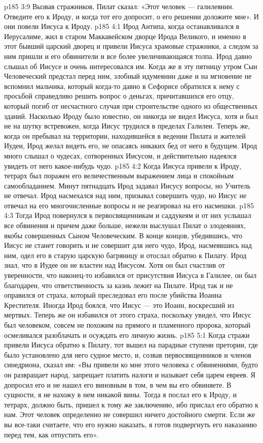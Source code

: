 \vs p185 3:9 Вызвав стражников, Пилат сказал: «Этот человек --- галилеянин. Отведите его к Ироду, и когда тот его допросит, о его решении доложите мне». И они повели Иисуса к Ироду.
\vs p185 4:1 Ирод Антипа, когда останавливался в Иерусалиме, жил в старом Маккавейском дворце Ирода Великого, и именно в этот бывший царский дворец и привели Иисуса храмовые стражники, а следом за ним пришли и его обвинители и все более увеличивающаяся толпа. Ирод давно слышал об Иисусе и очень интересовался им. Когда же в эту пятницу утром Сын Человеческий предстал перед ним, злобный идумеянин даже и на мгновение не вспомнил мальчика, который когда\hyp{}то давно в Сефорисе обратился к нему с просьбой справедливо решить вопрос о деньгах, причитавшихся его отцу, который погиб от несчастного случая при строительстве одного из общественных зданий. Насколько Ироду было известно, он никогда не видел Иисуса, хотя и был не на шутку встревожен, когда Иисус трудился в пределах Галилеи. Теперь же, когда он пребывал на территории, находившейся в ведении Пилата и жителей Иудеи, Ирод желал видеть его, не опасаясь никаких бед от него в будущем. Ирод много слышал о чудесах, сотворенных Иисусом, и действительно надеялся увидеть от него какое\hyp{}нибудь чудо.
\vs p185 4:2 Когда Иисуса привели к Ироду, тетрарх был поражен его величественным выражением лица и спокойным самообладанием. Минут пятнадцать Ирод задавал Иисусу вопросы, но Учитель не отвечал. Ирод насмехался над ним, призывал совершить чудо, но Иисус не отвечал на его многочисленные вопросы и не реагировал на его насмешки.
\vs p185 4:3 Тогда Ирод повернулся к первосвященникам и саддукеям и от них услышал все обвинения и причем даже больше, нежели выслушал Пилат о злодеяниях, якобы совершенных Сыном Человеческим. В конце концов, убедившись, что Иисус не станет говорить и не совершит для него чудо, Ирод, насмеявшись над ним, одел его в старую царскую багряницу и отослал обратно к Пилату. Ирод знал, что в Иудее он не властен над Иисусом. Хотя он был счастлив от уверенности, что наконец\hyp{}то избавился от присутствия Иисуса в Галилее, он был благодарен, что ответственность за казнь лежит на Пилате. Ирод так и не оправился от страха, который преследовал его после убийства Иоанна Крестителя. Иногда Ирод боялся, что Иисус --- это Иоанн, воскресший из мертвых. Теперь же он избавился от этого страха, поскольку увидел, что Иисус был человеком, совсем не похожим на прямого и пламенного пророка, который осмеливался разоблачать и осуждать его личную жизнь.
\vs p185 5:1 Когда стражи привели Иисуса обратно к Пилату, тот вышел на парадные ступени претории, где было установлено для него судное место, и, созвав первосвященников и членов синедриона, сказал им: «Вы привели ко мне этого человека с обвинениями, будто он развращает народ, запрещает платить налоги и называет себя царем евреев. Я допросил его и не нашел его виновным в том, в чем вы его обвиняете. В сущности, я не нахожу в нем никакой вины. Тогда я послал его к Ироду, и тетрарх, должно быть, пришел к тому же заключению, ибо прислал его обратно к нам. Этот человек определенно не совершил ничего достойного смерти. Если же вы все\hyp{}таки считаете, что его нужно наказать, я готов подвергнуть его наказанию перед тем, как отпустить его».
